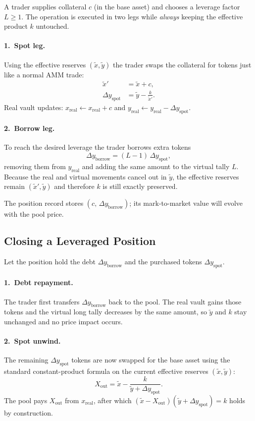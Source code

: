 \documentclass[11pt]{article}
\begin{document}
A trader supplies collateral $c$ (in the base asset) and chooses a leverage factor $L\ge 1$.  The operation is executed in two legs while \emph{always} keeping the effective product $k$ untouched.

\paragraph{1.~Spot leg.}  Using the effective reserves $(\tilde x,\tilde y)$ the trader swaps the collateral for tokens just like a normal AMM trade:
\begin{align}
\tilde x' &= \tilde x + c,\\
\Delta y_{\text{spot}} &= \tilde y - \frac{k}{\tilde x'} .
\end{align}
Real vault updates: $x_{\text{real}}\!\leftarrow x_{\text{real}}+c$ and $y_{\text{real}}\!\leftarrow y_{\text{real}}-\Delta y_{\text{spot}}$.

\paragraph{2.~Borrow leg.}  To reach the desired leverage the trader borrows extra tokens
\[
\Delta y_{\text{borrow}} = (L-1)\,\Delta y_{\text{spot}} ,
\]
removing them from $y_{\text{real}}$ and adding the same amount to the virtual tally $L$.  Because the real and virtual movements cancel out in $\tilde y$, the effective reserves remain $(\tilde x',\tilde y)$ and therefore $k$ is still exactly preserved.

The position record stores $(c,\,\Delta y_{\text{borrow}})$; its mark-to-market value will evolve with the pool price.

\subsection{Closing a Leveraged Position}

Let the position hold the debt $\Delta y_{\text{borrow}}$ and the purchased tokens $\Delta y_{\text{spot}}$.

\paragraph{1.~Debt repayment.}  The trader first transfers $\Delta y_{\text{borrow}}$ back to the pool.  The real vault gains those tokens and the virtual long tally decreases by the same amount, so $\tilde y$ and $k$ stay unchanged and no price impact occurs.

\paragraph{2.~Spot unwind.}  The remaining $\Delta y_{\text{spot}}$ tokens are now swapped for the base asset using the standard constant-product formula on the current effective reserves $(\tilde x,\tilde y)$:
\[
X_{\text{out}} = \tilde x - \frac{k}{\tilde y + \Delta y_{\text{spot}}} .
\]
The pool pays $X_{\text{out}}$ from $x_{\text{real}}$, after which $(\tilde x- X_{\text{out}})(\tilde y+\Delta y_{\text{spot}})=k$ holds by construction.
\end{document}
